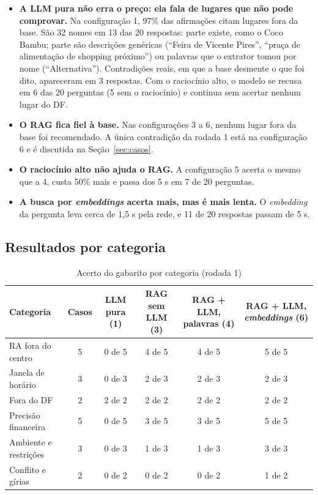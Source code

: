 \documentclass[11pt,a4paper]{article}
\newcommand{\fonte}{\vspace{0.1cm}\flushleft{\footnotesize{Fonte: elaborado pelos autores (2026).}}}
\begin{document}
\begin{itemize}
\item \textbf{A LLM pura não erra o preço: ela fala de lugares que não pode comprovar.} Na configuração 1, 97\% das afirmações citam lugares fora da base. São 32 nomes em 13 das 20 respostas: parte existe, como o Coco Bambu; parte são descrições genéricas (``Feira de Vicente Pires'', ``praça de alimentação de shopping próximo'') ou palavras que o extrator tomou por nome (``Alternativa''). Contradições reais, em que a base desmente o que foi dito, apareceram em 3 respostas. Com o raciocínio alto, o modelo se recusa em 6 das 20 perguntas (5 sem o raciocínio) e continua sem acertar nenhum lugar do DF.
\item \textbf{O RAG fica fiel à base.} Nas configurações 3 a 6, nenhum lugar fora da base foi recomendado. A única contradição da rodada 1 está na configuração 6 e é discutida na Seção~\ref{sec:casos}.
\item \textbf{O raciocínio alto não ajuda o RAG.} A configuração 5 acerta o mesmo que a 4, custa 50\% mais e passa dos 5 s em 7 de 20 perguntas.
\item \textbf{A busca por \textit{embeddings} acerta mais, mas é mais lenta.} O \textit{embedding} da pergunta leva cerca de 1,5 s pela rede, e 11 de 20 respostas passam de 5 s.
\end{itemize}

\subsection{Resultados por categoria}

\begin{table}[!htbp]
\centering
\small
\renewcommand{\arraystretch}{1.03}
\caption{Acerto do gabarito por categoria (rodada 1)}
\label{tab:categorias}
\begin{tabularx}{\textwidth}{p{3.8cm} c C C C C}
\toprule
\textbf{Categoria} & \textbf{Casos} & \textbf{LLM pura (1)} & \textbf{RAG sem LLM (3)} & \textbf{RAG + LLM, palavras (4)} & \textbf{RAG + LLM, \textit{embeddings} (6)} \\
\midrule
RA fora do centro & 5 & 0 de 5 & 4 de 5 & 4 de 5 & 5 de 5 \\
Janela de horário & 3 & 0 de 3 & 2 de 3 & 2 de 3 & 2 de 3 \\
Fora do DF & 2 & 2 de 2 & 2 de 2 & 2 de 2 & 2 de 2 \\
Precisão financeira & 5 & 0 de 5 & 3 de 5 & 3 de 5 & 5 de 5 \\
Ambiente e restrições & 3 & 0 de 3 & 1 de 3 & 1 de 3 & 3 de 3 \\
Conflito e gírias & 2 & 0 de 2 & 0 de 2 & 0 de 2 & 1 de 2 \\
\bottomrule
\end{tabularx}
\fonte
\end{table}
\end{document}
